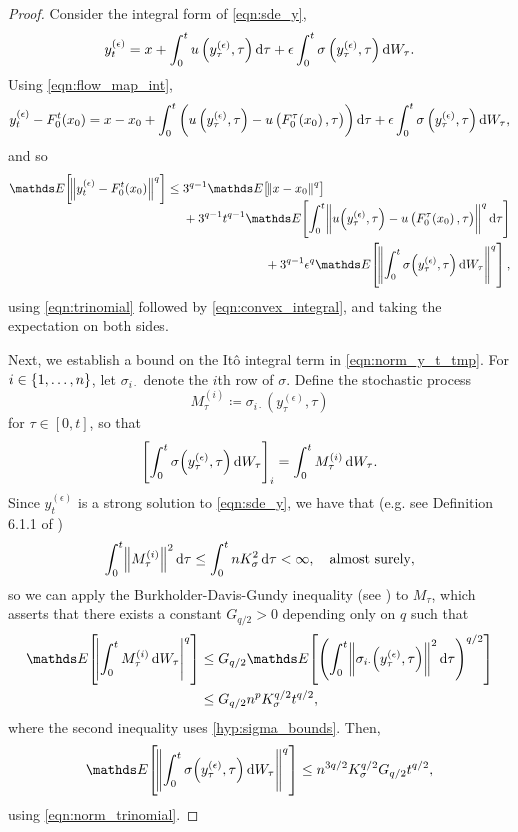 \begin{proof}
	Consider the integral form of \cref{eqn:sde_y},
	\[
		y_t^{(\epsilon)} = x + \int_0^t{u\left(y_\tau^{(\epsilon)}, \tau\right)\dif\tau} + \epsilon\int_0^t{\sigma\left(y_\tau^{(\epsilon)}, \tau\right)\dif W_\tau}.
	\]
	Using \cref{eqn:flow_map_int},
	\[
		y_t^{(\epsilon)} - F_0^t\!\left(x_0\right) = x - x_0 + \int_0^{t}{\left(u\left(y_\tau^{(\epsilon)}, \tau\right) - u\left(F_0^{\tau}\!\left(x_0\right), \tau\right)\right)\dif\tau} + \epsilon\int_0^t{\sigma\left(y_\tau^{(\epsilon)}, \tau\right)\dif W_\tau},
	\]
	and so
	\begin{equation}
		\avg{\norm{y_t^{(\epsilon)} - F_0^t\!\left(x_0\right)}^q} \leq \begin{multlined}[t]
			3^{q-1}\avg{\norm{x - x_0}^q} \\
			+ 3^{q-1}t^{q-1}\avg{\int_0^{t}{\norm{u\!\left(y_\tau^{(\epsilon)}, \tau\right) - u\left(F_0^{\tau}\!\left(x_0\right), \tau\right)}^q\dif\tau}} \\
			+ 3^{q-1}\epsilon^q\avg{\norm{\int_0^t{\sigma\!\left(y_\tau^{(\epsilon)}, \tau\right)\dif W_\tau}}^q},
		\end{multlined}
		\label{eqn:norm_y_t_tmp}
	\end{equation}
	using \cref{eqn:trinomial} followed by \cref{eqn:convex_integral}, and taking the expectation on both sides.

	Next, we establish a bound on the It\^o integral term in \cref{eqn:norm_y_t_tmp}.
	For \(i \in \set{1,\hdots,n}\), let \(\sigma_{i\cdot}\) denote the \(i\)th row of \(\sigma\).
	Define the stochastic process
	\[
		M_\tau^{(i)} \coloneqq \sigma_{i\cdot}\!\left(y_\tau^{(\epsilon)}, \tau\right)
	\]
	for \(\tau \in [0,t]\), so that
	\[
		\left[\int_0^t{\sigma\!\left(y_\tau^{(\epsilon)}, \tau\right)\dif W_\tau}\right]_i = \int_0^t{M_\tau^{(i)}\dif W_\tau}.
	\]
	Since \(y_t^{(\epsilon)}\) is a strong solution to \cref{eqn:sde_y}, we have that (e.g. see Definition 6.1.1 of \citet{KallianpurSundar_2014_StochasticAnalysisDiffusion})
	\[
		\int_0^t{\norm{M_\tau^{(i)}}^2\dif\tau} \leq \int_0^t{nK_\sigma^2\dif\tau} < \infty, \quad \text{almost surely},
	\]
	so we can apply the Burkholder-Davis-Gundy inequality (see ) to \(M_\tau\), which asserts that there exists a constant \(G_{q/2} > 0\) depending only on \(q\) such that
	\begin{align*}
		\avg{\abs{\int_0^t{M_\tau^{(i)}\dif W_\tau}}^{q}} & \leq G_{q/2} \avg{\left(\int_{0}^t{\norm{\sigma_{i\cdot}\!\left(y_\tau^{(\epsilon)}, \tau\right)}^2\dif\tau}\right)^{q/2}} \\
		                                                  & \leq G_{q/2} n^p K_{\sigma}^{q/2} t^{q/2},
	\end{align*}
	where the second inequality uses \ref{hyp:sigma_bounds}.
	Then,
	\begin{equation}
		\avg{\norm{\int_0^t{\sigma\!\left(y_\tau^{(\epsilon)}, \tau\right)\dif W_\tau}}^{q}} \leq n^{3q/2} K_\sigma^{q/2} G_{q/2} t^{q/2},
		\label{eqn:z_sigma_bound}
	\end{equation}
	using \cref{eqn:norm_trinomial}.


\end{proof}
